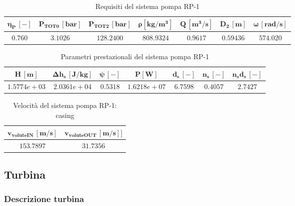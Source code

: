 \begin{table}[H]
\centering
\begin{tabular}{|c|c|c|c|c|c|c|}
\hline
$\bm{\eta_P \, [-]}$ & $\bm{P_ {TOT0} \, [bar]}$ & $\bm{P_{TOT2} \, [bar]}$ & $\bm{\rho [kg/m^3]}$ & $\bm{Q \, [m^3/s]}$ & $\bm{D_2 \, [m]}$ & $\bm{\omega \, [rad/s]}$  \\
\hline
$0.760$ & $3.1026$ & $128.2400$ &  $808.9324$ & $0.9617$ & $0.59436$ & $574.020$  \\
\hline
\end{tabular}

\caption{Requisiti del sistema pompa RP-1 \cite{turbopump_manual}}
\label{table:RP-1 pump specs}

\end{table}

\begin{table}[H]
\centering
\begin{tabular}{|c|c|c|c|c|c|c|}
\hline
$\bm{H \, [m]}$ & $\bm{\Delta h_s \, [J/kg]}$ & $\bm{\psi \, [-]}$ & $\bm{P [W]}$ & $\bm{d_s \, [-]}$ & $\bm{n_s \, [-]}$ & $\bm{n_s d_s \, [-]}$  \\
\hline
$1.5774e+03$ & $2.0361e+04$ & $0.5318$ &  $1.6218e+07$ & $6.7598$ & $0.4057$ & $2.7427$  \\
\hline
\end{tabular}

\caption{Parametri prestazionali del sistema pompa RP-1}
\label{table:RP-1 pump performance}

\end{table}

\begin{table}[H]
\centering
\begin{tabular}{|c|c|}
\hline
$\bm{v_{voluteIN} \, [m/s]}$ & $\bm{v_{voluteOUT} \, [m/s]]}$  \\
\hline
$153.7897$ & $31.7356$   \\
\hline
\end{tabular}

\caption{Velocità del sistema pompa RP-1: casing}
\label{table:RP-1 pump casing}

\end{table}



\subsection{Turbina}
\label{subsec:turbina}

\subsubsection{Descrizione turbina}

